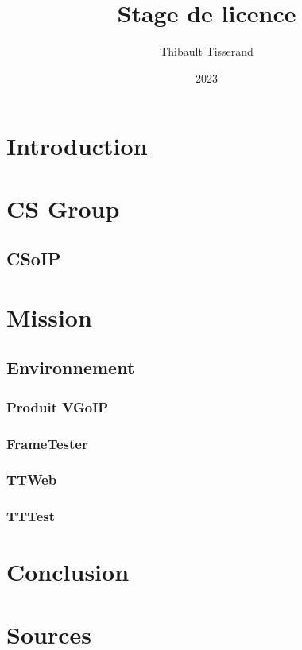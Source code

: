 \documentclass{beamer}
\title{Stage de licence}
\author{Thibault Tisserand}
\institute{Université de Lille}
\date{2023}
\begin{document}
\titlepage



\section{Introduction}


\section{CS Group}


\subsection{CSoIP}


\section{Mission}


\subsection{Environnement}


\subsubsection{Produit VGoIP}


\subsubsection{FrameTester}


\subsubsection{TTWeb}


\subsubsection{TTTest}


\section{Conclusion}


\section{Sources}

\end{document}
